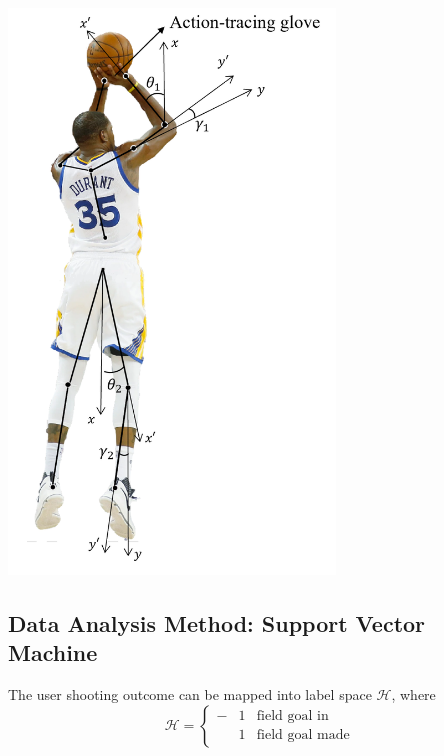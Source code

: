 \documentclass[12pt]{article}
\begin{document}
        \hfill
        \begin{minipage}[b]{0.45\linewidth}
        \includegraphics[height=15cm]{Shooting Skeleton_2.png}
        \end{minipage}
    \subsection{Data Analysis Method: Support Vector Machine}
    The user shooting outcome can be mapped into label space $\mathcal{H}$, where
    \begin{equation}
        \mathcal{H} = \left\{ \begin{aligned}
            -&1 &\text{field goal in} \\
            &1 &\text{field goal made}
        \end{aligned} \right.
    \end{equation}
\end{document}
